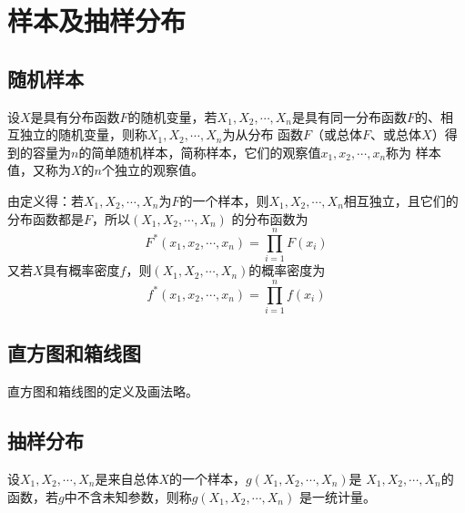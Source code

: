 \section{样本及抽样分布}
\subsection{随机样本}

\begin{definition}
    设$X$是具有分布函数$F$的随机变量，若$X_1,X_2,\cdots,X_n$是具有同一分布函数$F$的、相互独立的随机变量，则称$X_1,X_2,\cdots,X_n$为从分布
    函数$F$（或总体$F$、或总体$X$）得到的{\heiti 容量为$n$的简单随机样本}，简称{\heiti 样本}，它们的观察值$x_1,x_2,\cdots,x_n$称为
    {\heiti 样本值}，又称为$X$的$n$个{\heiti 独立的观察值}。

    由定义得：若$X_1,X_2,\cdots,X_n$为$F$的一个样本，则$X_1,X_2,\cdots,X_n$相互独立，且它们的分布函数都是$F$，所以$(X_1,X_2,\cdots,X_n)$
    的分布函数为
    $$F^\ast(x_1,x_2,\cdots,x_n)=\prod _{i=1}^n F(x_i)$$
    又若$X$具有概率密度$f$，则$(X_1,X_2,\cdots,X_n)$的概率密度为
    $$f^\ast(x_1,x_2,\cdots,x_n)=\prod _{i=1}^n f(x_i)$$
\end{definition}

\subsection{直方图和箱线图}
直方图和箱线图的定义及画法略。

\subsection{抽样分布}
\begin{definition}
    \begin{definition}
        设$X_1,X_2,\cdots,X_n$是来自总体$X$的一个样本，$g(X_1,X_2,\cdots,X_n)$是
        $X_1,X_2,\cdots,X_n$的函数，若$g$中不含未知参数，则称$g(X_1,X_2,\cdots,X_n)$
        是一{\heiti 统计量}。
    \end{definition}
\end{definition}